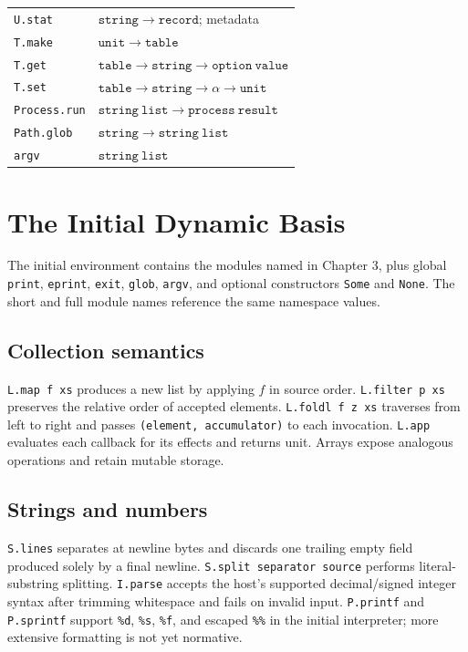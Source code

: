 \documentclass[11pt,oneside,openany]{book}
\newcommand{\kw}[1]{\texttt{#1}}
\begin{document}
\begin{longtable}{@{}p{}p{}@{}}
\kw{U.stat} & $\mathtt{string}\to\mathtt{record}$; metadata\\
\kw{T.make} & $\mathtt{unit}\to\mathtt{table}$\\
\kw{T.get} & $\mathtt{table}\to\mathtt{string}\to\mathtt{option\ value}$\\
\kw{T.set} & $\mathtt{table}\to\mathtt{string}\to\alpha\to\mathtt{unit}$\\
\kw{Process.run} & $\mathtt{string\ list}\to\mathtt{process\ result}$\\
\kw{Path.glob} & $\mathtt{string}\to\mathtt{string\ list}$\\
\kw{argv} & $\mathtt{string\ list}$\\
\bottomrule
\end{longtable}
\normalsize

\chapter{The Initial Dynamic Basis}
\label{app:dynamic}
The initial environment contains the modules named in Chapter 3, plus global \kw{print}, \kw{eprint}, \kw{exit}, \kw{glob}, \kw{argv}, and optional constructors \kw{Some} and \kw{None}. The short and full module names reference the same namespace values.

\section{Collection semantics}
\kw{L.map f xs} produces a new list by applying $f$ in source order. \kw{L.filter p xs} preserves the relative order of accepted elements. \kw{L.foldl f z xs} traverses from left to right and passes \kw{(element, accumulator)} to each invocation. \kw{L.app} evaluates each callback for its effects and returns unit. Arrays expose analogous operations and retain mutable storage.

\section{Strings and numbers}
\kw{S.lines} separates at newline bytes and discards one trailing empty field produced solely by a final newline. \kw{S.split separator source} performs literal-substring splitting. \kw{I.parse} accepts the host's supported decimal/signed integer syntax after trimming whitespace and fails on invalid input. \kw{P.printf} and \kw{P.sprintf} support \kw{\%d}, \kw{\%s}, \kw{\%f}, and escaped \kw{\%\%} in the initial interpreter; more extensive formatting is not yet normative.
\end{document}
